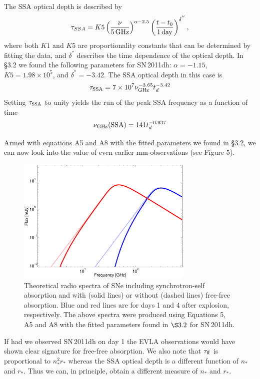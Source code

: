 \documentclass{emulateapj}
\begin{document}
The
SSA optical depth is described by
\begin{equation}
\tau_{SSA}=K5 \left(\frac{\nu}{\rm 5\,GHz}\right)^{\alpha-2.5}
\left(\frac{t-t_{0}}
{\rm 1\,day}\right)^{\delta^{''}},
\end{equation}
where both $K1$ and $K5$ are proportionality constants that can be
determined by fitting the data, and $\delta^{''}$ describes the time
dependence of the optical depth.
In \S 3.2 we found the following parameters for SN\,2011dh: $\alpha=-1.15$,$K5=1.98\times 10^{5}$, and
$\delta^{''}=-3.42$. The SSA optical depth in this case is 
\begin{equation}
\tau_{\rm SSA}=7 \times 10^{7} \nu_{\rm GHz}^{-3.65} t_d^{-3.42}
\end{equation}
Setting $\tau_{\rm SSA}$ to unity yields the run of the peak SSA
frequency as a function of time
\begin{equation}
\nu_{\rm GHz}({\rm SSA})=141t_d^{-0.937}
\end{equation}


Armed with equations A5 and A8 with the fitted parameters we
found in \S 3.2, we can now look into the value of even earlier
mm-observations (see Figure 5). 
\begin{figure}[!ht]
\centering
\includegraphics[width=0.75\textwidth]{PTF11eon_early_new.eps}
\caption{Theoretical radio spectra of SNe including synchrotron-self absorption and with (solid lines) or without
(dashed lines) free-free absorption. Blue and red lines are for days 1
and 4 after explosion, respectively. The above spectra were produced
using Equations 5, A5 and A8 with the fitted parameters found in $\S
3.2$ for SN\,2011dh.}
\end{figure}
If had we observed SN\,2011dh on day 1 the EVLA observations would have shown clear
signature for free-free absorption. We also note that $\tau_{\rm ff}$
is proportional to $n_*^2r_*$ whereas the SSA optical depth is a
different function of $n_*$ and $r_*$. Thus we can, in principle, obtain a different measure of $n_*$ and $r_*$.
\end{document}
